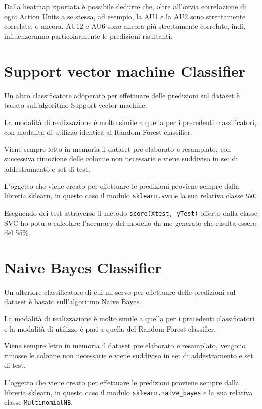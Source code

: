 Dalla heatmap riportata è possibile dedurre che, oltre all’ovvia correlazione di ogni Action Units a se stessa, ad esempio, la AU1 e la AU2 sono strettamente correlate, o ancora, AU12 e AU6 sono ancora più strettamente correlate, indi, influenzeranno particolarmente le predizioni risultanti.


\section{Support vector machine Classifier}
Un altro classificatore adoperato per effettuare delle predizioni sul dataset è basato sull’algoritmo Support vector machine.

La modalità di realizzazione è molto simile a quella per i precedenti classificatori, con modalità di utilizzo identica al Random Forest classifier.

Viene sempre letto in memoria il dataset pre elaborato e resamplato, con successiva rimozione delle colonne non necessarie e viene suddiviso in set di addestramento e set di test.

L’oggetto che viene creato per effettuare le predizioni proviene sempre dalla libreria sklearn, in questo caso il modulo \texttt{sklearn.svm} e la sua relativa classe \texttt{SVC}.

Eseguendo dei test attraverso il metodo \mintinline[bgcolor=bg]
{python}{score(Xtest, yTest)} offerto dalla classe SVC ho potuto calcolare l’accuracy del modello da me generato che risulta essere del 55\%.

\section{Naive Bayes Classifier}
Un ulteriore classificatore di cui mi servo per effettuare delle predizioni sul dataset è basato sull’algoritmo Naive Bayes.

La modalità di realizzazione è molto simile a quella per i precedenti classificatori e la modalità di utilizzo è pari a quella del Random Forest classifier.

Viene sempre letto in memoria il dataset pre elaborato e resamplato, vengono rimosse le colonne non necessarie e viene suddiviso in set di addestramento e set di test.

L’oggetto che viene creato per effettuare le predizioni proviene sempre dalla libreria sklearn, in questo caso il modulo \texttt{sklearn.naive_bayes} e la sua relativa classe \texttt{MultinomialNB}.

